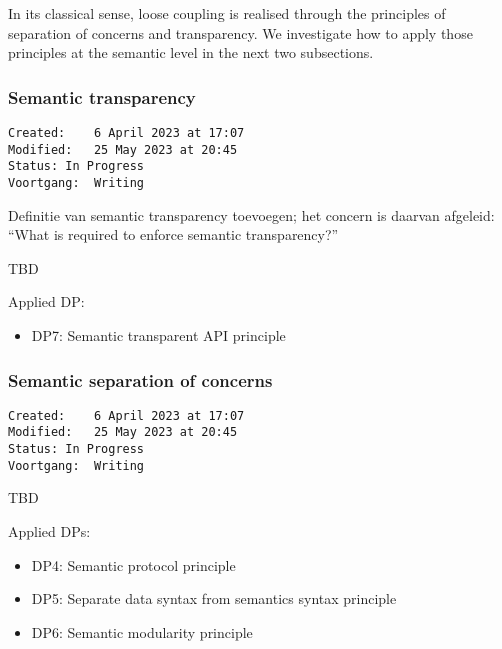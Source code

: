 \documentclass[sort&compress,preprint,3p,authoryear,twocolumn]{elsarticle}
\providecommand{\tightlist}{%
  \setlength{\itemsep}{0pt}\setlength{\parskip}{0pt}}
\theoremstyle{break}			%
\begin{document}
In its classical sense, loose coupling is realised through the
principles of separation of concerns and transparency. We investigate
how to apply those principles at the semantic level in the next two
subsections.

\subsubsection{Semantic transparency}\label{semantic-transparency}

\begin{verbatim}
Created:    6 April 2023 at 17:07
Modified:   25 May 2023 at 20:45
Status: In Progress
Voortgang:  Writing
\end{verbatim}

Definitie van semantic transparency toevoegen; het concern is daarvan
afgeleid: ``What is required to enforce semantic transparency?''

\begin{mmconcern}\label{cncrn:stc}
TBD
\end{mmconcern}

Applied DP:

\begin{itemize}
\tightlist
\item
  DP7: Semantic transparent API principle
\end{itemize}

\subsubsection{Semantic separation of
concerns}\label{semantic-separation-of-concerns}

\begin{verbatim}
Created:    6 April 2023 at 17:07
Modified:   25 May 2023 at 20:45
Status: In Progress
Voortgang:  Writing
\end{verbatim}

\begin{mmconcern}\label{cncrn:ssoc}
TBD
\end{mmconcern}

Applied DPs:

\begin{itemize}
\tightlist
\item
  DP4: Semantic protocol principle
\item
  DP5: Separate data syntax from semantics syntax principle
\item
  DP6: Semantic modularity principle
\end{itemize}
\end{document}
